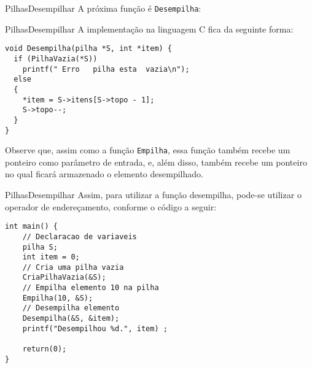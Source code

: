 \documentclass[aspectratio=169]{beamer}
\begin{document}
\begin{frame}[fragile]{Pilhas}{Desempilhar}
A próxima função é \verb|Desempilha|:
\begin{algorithm}[H]
\caption{Desempilhar} 
\label{Desempilhar}
\end{algorithm}
\end{frame}


\begin{frame}[fragile]{Pilhas}{Desempilhar}
A implementação na linguagem C fica da seguinte forma:

\begin{lstlisting}[style=CStyle]
void Desempilha(pilha *S, int *item) { 
  if (PilhaVazia(*S)) 
    printf(" Erro   pilha esta  vazia\n");
  else 
  { 
    *item = S->itens[S->topo - 1]; 
    S->topo--;     
  }
} 
\end{lstlisting}  
Observe que, assim como a função \verb|Empilha|, essa função também recebe um ponteiro como parâmetro de entrada, e, além disso, também recebe um ponteiro no qual ficará armazenado o elemento desempilhado. 
\end{frame}


\begin{frame}[fragile]{Pilhas}{Desempilhar}
Assim, para utilizar a função desempilha, pode-se utilizar o operador de endereçamento, conforme o código a seguir:

\begin{lstlisting}[style=CStyle]
int main() { 
    // Declaracao de variaveis
	pilha S; 
	int item = 0;
	// Cria uma pilha vazia
	CriaPilhaVazia(&S);
    // Empilha elemento 10 na pilha
	Empilha(10, &S);
	// Desempilha elemento
	Desempilha(&S, &item);
	printf("Desempilhou %d.", item)	;
	
	return(0);
} 
\end{lstlisting}  
\end{frame}
\end{document}
